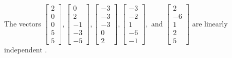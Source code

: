 \begin{exercise}
\begin{exerciseStatement}
  \end{exerciseStatement}
  \begin{exerciseAnswer}
   The vectors \(\left[\begin{array}{r}
2 \\
0 \\
0 \\
5 \\
5
\end{array}\right] , \left[\begin{array}{r}
0 \\
2 \\
-1 \\
-3 \\
-5
\end{array}\right] , \left[\begin{array}{r}
-3 \\
-3 \\
-3 \\
0 \\
2
\end{array}\right] , \left[\begin{array}{r}
-3 \\
-2 \\
1 \\
-6 \\
-1
\end{array}\right] , \text{ and } \left[\begin{array}{r}
2 \\
-6 \\
1 \\
2 \\
5
\end{array}\right]\) are 
  	 linearly independent  .
  


  \end{exerciseAnswer}
\end{exercise}